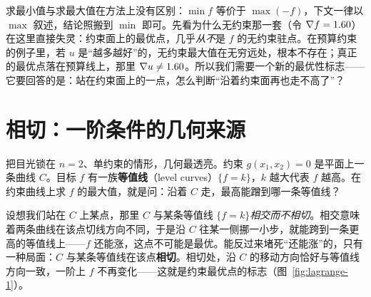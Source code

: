 求最小值与求最大值在方法上没有区别：$\min f$ 等价于 $\max(-f)$，下文一律以 $\max$ 叙述，结论照搬到 $\min$ 即可。先看为什么无约束那一套（令 $\nabla f=1.6 0$）在这里直接失灵：约束面上的最优点，几乎\emph{从不}是 $f$ 的无约束驻点。在预算约束的例子里，若 $u$ 是``越多越好''的，无约束最大值在无穷远处，根本不存在；真正的最优点落在预算线上，那里 $\nabla u\neq1.6 0$。所以我们需要一个新的最优性标志——它要回答的是：站在约束面上的一点，怎么判断``沿着约束面再也走不高了''？

\section{相切：一阶条件的几何来源}
\label{sec:lagrange-2}

把目光锁在 $n=2$、单约束的情形，几何最透亮。约束 $g(x_1,x_2)=0$ 是平面上一条曲线 $C$。目标 $f$ 有一族\textbf{等值线}（level curves）$\{f=k\}$，$k$ 越大代表 $f$ 越高。在约束曲线上求 $f$ 的最大值，就是问：沿着 $C$ 走，最高能蹭到哪一条等值线？

设想我们站在 $C$ 上某点，那里 $C$ 与某条等值线 $\{f=k\}$\emph{相交而不相切}。相交意味着两条曲线在该点切线方向不同，于是沿 $C$ 往某一侧挪一小步，就能跨到一条更高的等值线上——$f$ 还能涨，这点不可能是最优。能反过来堵死``还能涨''的，只有一种局面：$C$ 与某条等值线在该点\textbf{相切}。相切处，沿 $C$ 的移动方向恰好与等值线方向一致，一阶上 $f$ 不再变化——这就是约束最优点的标志（图~\ref{fig:lagrange-1}）。

